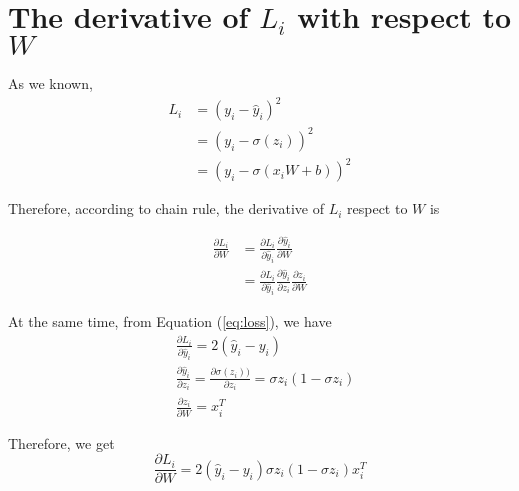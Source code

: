 \documentclass[a4paper]{article}
\begin{document}
\section{The derivative of $L_i$ with respect to $W$}
As we known, 
\begin{align}
\label{eq:loss}
    L_i & =  (y_i - \hat{y}_i)^2 \\
        & =   (y_i - \sigma(z_i))^2 \\
        & =   (y_i - \sigma(x_iW+b))^2 
\end{align}

Therefore, according to chain rule, the derivative of $L_i$ respect to $W$ is

\begin{align}
    \frac{\partial{L_i}}{\partial{W}} &= \frac{\partial{L_i}}{\partial{\hat{y}_i}}\frac{\partial{\hat{y}_i}}{\partial{W}} \\
    &= \frac{\partial{L_i}}{\partial{\hat{y}_i}}\frac{\partial{\hat{y}_i}}{\partial{z_i}}\frac{\partial{z_i}}{\partial{W}} 
\end{align}

At the same time, from Equation (\ref{eq:loss}), we have
\begin{align}
\label{eq:loss}
    & \frac{\partial{L_i}}{\partial{\hat{y}_i}} = 2(\hat{y}_i - y_i) \\
    & \frac{\partial{\hat{y}_i}}{\partial{z_i}} = \frac{\partial{\sigma(z_i))}}{\partial{z_i}} = \sigma{z_i}(1-\sigma{z_i}) \\
    & \frac{\partial{z_i}}{\partial{W}} = x_i^T 
\end{align}

Therefore, we get
\begin{equation}
   \frac{\partial{L_i}}{\partial{W}} = 2(\hat{y}_i - y_i)\sigma{z_i}(1-\sigma{z_i})x_i^T
\end{equation}




\end{document}
